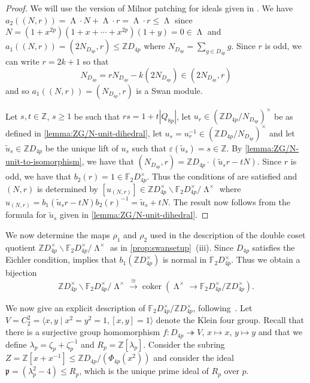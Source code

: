 \documentclass[11pt,leqno,a4paper]{amsart}
\newcommand{\Z}{\mathbb{Z}}
\newcommand{\F}{\mathbb{F}}
\DeclareMathOperator{\coker}{coker}
\DeclareMathOperator{\LL}{\Lambda}
\theoremstyle{definition}
\theoremstyle{remark}
\theoremstyle{custom}
\newcommand{\wt}{\widetilde}
\begin{document}
\begin{proof}
We will use the version of Milnor patching for ideals given in \cite[Lemma 2.3]{HN25}. 
We have $a_2((N,r)) = \LL \cdot N + \LL \cdot r = \LL \cdot r \le \LL$ since $N = (1+x^{2p})(1+ x + \cdots + x^{2p})(1+y) = 0 \in \LL$ and $a_1((N,r)) = (2N_{D_{4p}},r) \le \Z D_{4p}$ where $N_{D_{4p}} = \sum_{g \in D_{4p}} g$. Since $r$ is odd, we can write $r=2k+1$ so that 
\[N_{D_{4p}} = r N_{D_{4p}} - k(2N_{D_{4p}}) \in (2N_{D_{4p}},r)\]
and so $a_1((N,r)) = (N_{D_{4p}},r)$ is a Swan module. 

Let $s,t \in \Z$, $s \geq 1$ be such that $rs = 1+t|Q_{8p}|$, let $u_r \in (\Z D_{4p}/N_{D_{4p}})^\times$ be as defined in \cref{lemma:ZG/N-unit-dihedral}, let $u_s = u_r^{-1} \in (\Z D_{4p}/N_{D_{4p}})^\times$ and let $\wt u_s \in \Z D_{4p}$ be the unique lift of $u_s$ such that $\varepsilon(\wt u_s) = s \in \Z$.
By \cref{lemma:ZG/N-unit-to-isomorphism}, we have that 
$(N_{D_{4p}},r) = \Z D_{4p} \cdot (\wt u_s r - tN)$.
Since $r$ is odd, we have that  $b_2(r) = 1 \in \F_2 D_{4p}^\times$. Thus the conditions of \cite[Lemma 2.3]{HN25} are satisfied and $(N,r)$ is determined by $[u_{(N, r)}] \in \Z D_{4p}^\times \backslash \F_2 D_{4p}^\times /{\LL^\times}$ where $u_{(N,r)} = b_1(\wt u_s r - tN)b_2(r)^{-1} = \wt u_s + tN$. The result now follows from the formula for $\wt u_s$ given in \cref{lemma:ZG/N-unit-dihedral}.
\end{proof}

We now determine the maps $\rho_1$ and $\rho_2$ used in the description of the double coset quotient $\Z D_{4p}^\times \backslash \F_2 D_{4p}^\times /{\LL^\times}$ as in \cref{prop:swansetup}~(iii).
Since $D_{4p}$ satisfies the Eichler condition, \cite[Theorem A18]{Sw83} implies that $b_1(\Z D_{4p}^\times)$ is normal in $\F_2 D_{4p}^\times$. Thus we obtain a bijection 
\[ \Z D_{4p}^\times \backslash \F_2 D_{4p}^\times /{\LL^\times} \xrightarrow[]{\cong} \coker \left(\LL^\times \to {\F_2D_{4p}^\times}/{\Z D_{4p}^\times}\right). \]

We now give an explicit description of $\F_2 D_{4p}^\times/\Z D_{4p}^\times$, following~\cite{Sw83}.
Let $V = C_2^2 = \langle x, y \mid x^2=y^2=1,[x,y]=1 \rangle$ denote the Klein four group. Recall that there is a surjective group homomorphism $f : D_{4p} \twoheadrightarrow V$, $x \mapsto x$, $y \mapsto y$ and that
we define $\lambda_p = \zeta_p+\zeta_p^{-1}$ and $R_p = \Z[\lambda_p]$. 
Consider the subring $Z = \Z[x+x^{-1}] \le \Z D_{4p}/(\Phi_{4p}(x^2))$ and consider the ideal $\mathfrak{p} = (\lambda_p^2-4) \le R_p$, which is the unique prime ideal of $R_p$ over $p$. 
\end{document}
